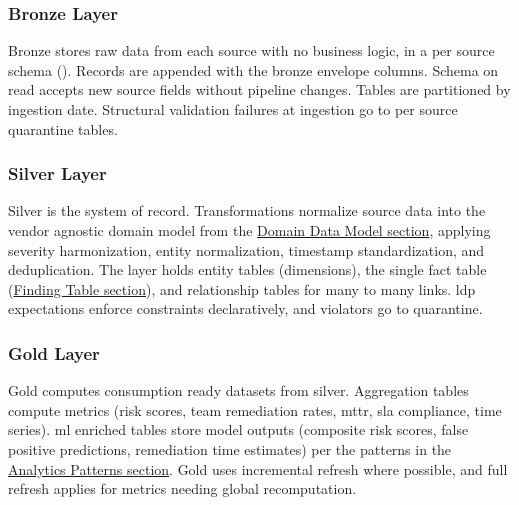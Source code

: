 \begin{center}
\begin{minipage}{\textwidth}
\label{fig:medallion-design}
\end{minipage}
\end{center}

\subsubsection{Bronze Layer}

Bronze stores raw data from each source with no business logic, in a per source schema (). Records are appended with the bronze envelope columns. Schema on read accepts new source fields without pipeline changes. Tables are partitioned by ingestion date. Structural validation failures at ingestion go to per source quarantine tables.

\subsubsection{Silver Layer}

Silver is the system of record. Transformations normalize source data into the vendor agnostic domain model from the \hyperref[sec:data-entities]{Domain Data Model section}, applying severity harmonization, entity normalization, timestamp standardization, and deduplication. The layer holds entity tables (dimensions), the single  fact table (\hyperref[sec:silver-findings-design]{Finding Table section}), and relationship tables for many to many links. \Gls{ldp} expectations enforce constraints declaratively, and violators go to quarantine.

\subsubsection{Gold Layer}

Gold computes consumption ready datasets from silver. Aggregation tables compute metrics (risk scores, team remediation rates, \gls{mttr}, \gls{sla} compliance, time series). \Gls{ml} enriched tables store model outputs (composite risk scores, false positive predictions, remediation time estimates) per the patterns in the \hyperref[sec:analytics-patterns]{Analytics Patterns section}. Gold uses incremental refresh where possible, and full refresh applies for metrics needing global recomputation.

